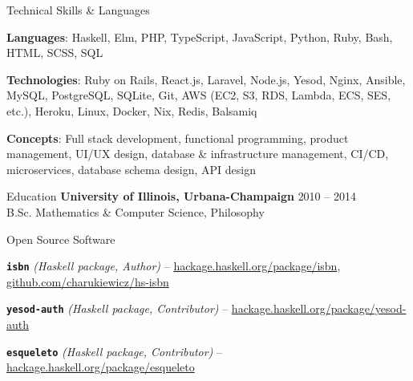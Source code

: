 \documentclass{resume} %
\begin{document}
\begin{rSection}{Technical Skills \& Languages}

\begin{rListSection}
\item \textbf{Languages}: Haskell, Elm, PHP, TypeScript, JavaScript, Python, Ruby, Bash, HTML, SCSS, SQL
\item \textbf{Technologies}:  Ruby on Rails, React.js, Laravel, Node.js, Yesod, Nginx, Ansible, MySQL, PostgreSQL, SQLite, Git, AWS (EC2, S3, RDS, Lambda, ECS, SES, etc.), Heroku, Linux, Docker, Nix, Redis, Balsamiq
\item \textbf{Concepts}: Full stack development, functional programming, product management, UI/UX design, database \& infrastructure management, CI/CD, microservices, database schema design, API design
\end{rListSection}

\end{rSection}


\begin{rSection}{Education}
{\bf University of Illinois, Urbana-Champaign} \hfill {\textsc{2010 -- 2014}} \\
B.Sc. Mathematics \& Computer Science, Philosophy
\end{rSection}


\begin{rSection}{Open Source Software}

\begin{rListSection}
\item \textbf{\texttt{isbn}} {\em (Haskell package, Author)} -- \href{https://hackage.haskell.org/package/isbn}{hackage.haskell.org/package/isbn}, \href{https://github.com/charukiewicz/hs-isbn}{github.com/charukiewicz/hs-isbn}
\item \textbf{\texttt{yesod-auth}} {\em (Haskell package, Contributor)} -- \href{https://hackage.haskell.org/package/yesod-auth}{hackage.haskell.org/package/yesod-auth}
\item \textbf{\texttt{esqueleto}} {\em (Haskell package, Contributor)} -- \href{https://hackage.haskell.org/package/esqueleto}{hackage.haskell.org/package/esqueleto}
\end{rListSection}

\end{rSection}
\end{document}
